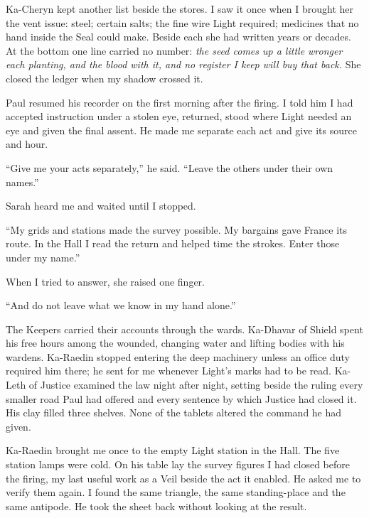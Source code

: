 Ka-Cheryn kept another list beside the stores. I saw it once when I brought her the vent issue: steel; certain salts; the fine wire Light required; medicines that no hand inside the Seal could make. Beside each she had written years or decades. At the bottom one line carried no number: \emph{the seed comes up a little wronger each planting, and the blood with it, and no register I keep will buy that back.} She closed the ledger when my shadow crossed it.\par

\ornament

Paul resumed his recorder on the first morning after the firing. I told him I had accepted instruction under a stolen eye, returned, stood where Light needed an eye and given the final assent. He made me separate each act and give its source and hour.\par

``Give me your acts separately,'' he said. ``Leave the others under their own names.''\par

Sarah heard me and waited until I stopped.\par

``My grids and stations made the survey possible. My bargains gave France its route. In the Hall I read the return and helped time the strokes. Enter those under my name.''\par

When I tried to answer, she raised one finger.\par

``And do not leave what we know in my hand alone.''\par

The Keepers carried their accounts through the wards. Ka-Dhavar of Shield spent his free hours among the wounded, changing water and lifting bodies with his wardens. Ka-Raedin stopped entering the deep machinery unless an office duty required him there; he sent for me whenever Light's marks had to be read. Ka-Leth of Justice examined the law night after night, setting beside the ruling every smaller road Paul had offered and every sentence by which Justice had closed it. His clay filled three shelves. None of the tablets altered the command he had given.\par

Ka-Raedin brought me once to the empty Light station in the Hall. The five station lamps were cold. On his table lay the survey figures I had closed before the firing, my last useful work as a Veil beside the act it enabled. He asked me to verify them again. I found the same triangle, the same standing-place and the same antipode. He took the sheet back without looking at the result.\par

